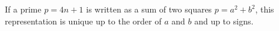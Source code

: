 If a prime $p = 4n + 1$ is written as a sum of two squares $p = a^2 + b^2$, this representation is unique up to the order of $a$ and $b$ and up to signs.
